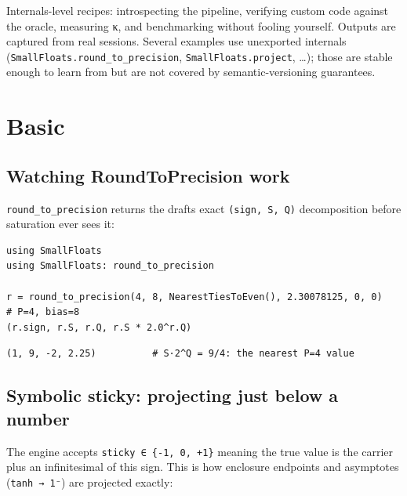 \label{4476403263922386643}{}


Internals-level recipes: introspecting the pipeline, verifying custom code against the oracle, measuring κ, and benchmarking without fooling yourself. Outputs are captured from real sessions. Several examples use unexported internals (\texttt{SmallFloats.round\_to\_precision}, \texttt{SmallFloats.project}, …); those are stable enough to learn from but are not covered by semantic-versioning guarantees.



\section{Basic}



\label{13551325986707881962}{}


\subsection{Watching RoundToPrecision work}



\label{2755073532632396567}{}


\texttt{round\_to\_precision} returns the draft{\textquotesingle}s exact \texttt{(sign, S, Q)} decomposition before saturation ever sees it:




\begin{verbatim}
using SmallFloats
using SmallFloats: round_to_precision

r = round_to_precision(4, 8, NearestTiesToEven(), 2.30078125, 0, 0)   # P=4, bias=8
(r.sign, r.S, r.Q, r.S * 2.0^r.Q)
\end{verbatim}




\begin{verbatim}
(1, 9, -2, 2.25)          # S·2^Q = 9/4: the nearest P=4 value
\end{verbatim}



\subsection{Symbolic sticky: projecting {\textquotedbl}just below{\textquotedbl} a number}



\label{1121493031502271068}{}


The engine accepts \texttt{sticky ∈ \{-1, 0, +1\}} meaning {\textquotedbl}the true value is the carrier plus an infinitesimal of this sign{\textquotedbl}. This is how enclosure endpoints and asymptotes (\texttt{tanh → 1⁻}) are projected exactly:




